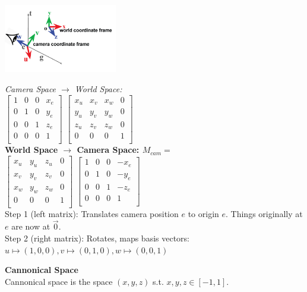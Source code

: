 \documentclass[letterpaper, 8pt]{extarticle}
\begin{document}
\begin{multicols*}{4}
\includegraphics[height=3cm]{camera-basis.png} 

\textit{Camera Space $\to$ World Space:}\\
\(
\begin{bmatrix}
    1 & 0 & 0 & x_e \\
    0 & 1 & 0 & y_e \\
    0 & 0 & 1 & z_e \\
    0 & 0 & 0 & 1 \\
\end{bmatrix}
\)
\(
\begin{bmatrix}
    x_u & x_v & x_w & 0 \\
    y_u & y_v & y_w & 0 \\
    z_u & z_v & z_w & 0 \\
    0 & 0 & 0 & 1 \\
\end{bmatrix}
\)\\

\textbf{World Space $\to$ Camera Space: $M_{cam}=$}\\
\(
\begin{bmatrix}
    x_u & y_u & z_u & 0 \\
    x_v & y_v & z_v & 0 \\
    x_w & y_w & z_w & 0 \\
    0 & 0 & 0 & 1 \\
\end{bmatrix}
\)
\(
\begin{bmatrix}
    1 & 0 & 0 & -x_e \\
    0 & 1 & 0 & -y_e \\
    0 & 0 & 1 & -z_e \\
    0 & 0 & 0 & 1 \\
\end{bmatrix}
\)
\\
Step 1 (left matrix): Translates camera position $e$ to origin $e$. Things originally at $e$ are now at $\vec{0}$.\\
Step 2 (right matrix): Rotates, maps basis vectors: $u \mapsto (1,0,0), v \mapsto (0,1,0), w \mapsto (0,0,1)$ 

\textbf{Cannonical Space}\\
Cannonical space is the space $(x, y, z)$ s.t. $x,y,z \in [-1, 1]$.


\end{multicols*}
\end{document}
